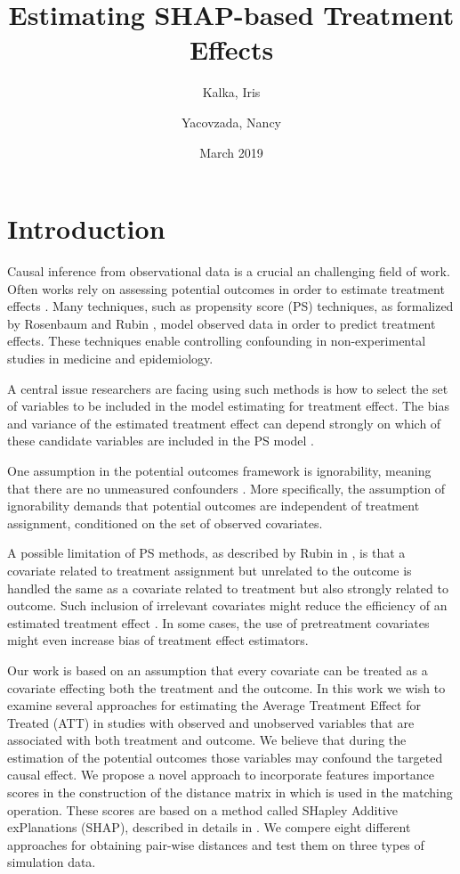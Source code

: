 \documentclass{article}
\title{Estimating SHAP-based Treatment Effects}
\author{Kalka, Iris
        \and
        Yacovzada, Nancy}
\date{March 2019}
\begin{document}
\maketitle

\section{Introduction}


Causal inference from observational data is a crucial an challenging field of work. Often works rely on assessing potential outcomes in order to estimate treatment effects \cite{rubin1974estimating}. Many techniques, such as propensity score (PS) techniques, as formalized by Rosenbaum and Rubin \cite{rosenbaum1983central}, model observed data in order to predict treatment effects. These techniques enable controlling confounding in non-experimental studies in medicine and epidemiology. 


A central issue researchers are facing using such methods is how to select the set of variables to be included in the model estimating for treatment effect. The bias and variance of the estimated treatment effect can depend strongly on which of these candidate variables are included in the PS model \cite{brookhart2006variable}.

One assumption in the potential outcomes framework is ignorability, meaning that there are no unmeasured confounders \cite{rosenbaum1983central}. More specifically, the assumption of ignorability demands that potential outcomes are independent of treatment assignment, conditioned on the set of observed covariates.

A possible limitation of PS methods, as described by Rubin in \cite{rubin1997estimating}, is that a covariate related to treatment assignment but unrelated to the outcome is handled the same as a covariate related to treatment but also strongly related to outcome. Such inclusion of irrelevant covariates might reduce the efficiency of an estimated treatment effect \cite{10.1093/biomet/asx009}. In some cases, the use of pretreatment covariates might even increase bias of treatment effect estimators.

Our work is based on an assumption that every covariate can be treated as a covariate effecting both the treatment and the outcome. 
In this work we wish to examine several approaches for estimating the Average Treatment Effect for Treated (ATT) in studies with observed and unobserved variables that are associated with both treatment and outcome. We believe that during the estimation of the potential outcomes those variables may confound the targeted causal effect. 
We propose a novel approach to incorporate features importance scores in the construction of the distance matrix in which is used in the matching operation. These scores are based on a method called  SHapley Additive exPlanations (SHAP), described in details in \cite{lundberg2017unified}. 
We compere eight different approaches for obtaining pair-wise distances and test them on three types of simulation data. 
\end{document}
